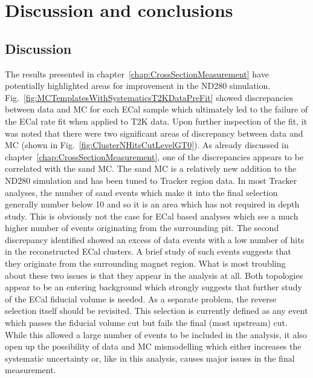 \chapter{Discussion and conclusions}
\label{chap:DiscussionAndConclusions}

\section{Discussion}
\label{sec:Discussion}
The results presented in chapter~\ref{chap:CrossSectionMeasurement} have potentially highlighted areas for improvement in the ND280 simulation.  Fig.~\ref{fig:MCTemplatesWithSystematicsT2KDataPreFit} showed discrepancies between data and MC for each ECal sample which ultimately led to the failure of the ECal rate fit when applied to T2K data.  Upon further inspection of the fit, it was noted that there were two significant areas of discrepancy between data and MC (shown in Fig.~\ref{fig:ClusterNHitsCutLevelGT0}).
\newline
\newline
As already discussed in chapter~\ref{chap:CrossSectionMeasurement}, one of the discrepancies appears to be correlated with the sand MC.  The sand MC is a relatively new addition to the ND280 simulation and has been tuned to Tracker region data.  In most Tracker analyses, the number of sand events which make it into the final selection generally number below 10 and so it is an area which has not required in depth study.  This is obviously not the case for ECal based analyses which see a much higher number of events originating from the surrounding pit.  The second discrepancy identified showed an excess of data events with a low number of hits in the reconstructed ECal clusters.  A brief study of such events suggests that they originate from the surrounding magnet region.  What is most troubling about these two issues is that they appear in the analysis at all.  Both topologies appear to be an entering background which strongly suggests that further study of the ECal fiducial volume is needed.  
\newline
\newline
As a separate problem, the reverse selection itself should be revisited.  This selection is currently defined as any event which passes the fiducial volume cut but fails the final (most upstream) cut.  While this allowed a large number of events to be included in the analysis, it also open up the possibility of data and MC mismodelling which either increases the systematic uncertainty or, like in this analysis, causes major issues in the final measurement.
